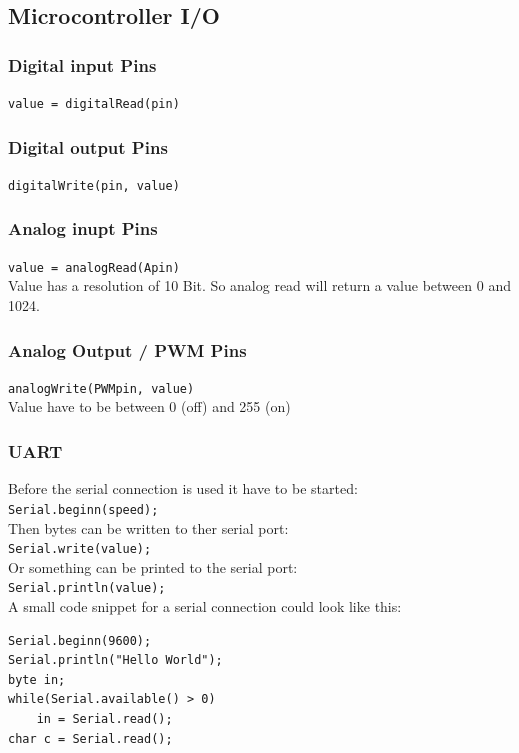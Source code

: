 \documentclass[english, 10pt]{report}
\begin{document}
\subsection{Microcontroller I/O}
\subsubsection{Digital input Pins}
\lstinline|value = digitalRead(pin)|

\subsubsection{Digital output Pins}
\lstinline|digitalWrite(pin, value)|

\subsubsection{Analog inupt Pins}
\lstinline|value = analogRead(Apin)| \\
Value has a resolution of 10 Bit.
So analog read will return a value between 0 and 1024.

\subsubsection{Analog Output / PWM Pins}
\lstinline|analogWrite(PWMpin, value)| \\
Value have to be between 0 (off) and 255 (on)

\subsubsection{UART}
Before the serial connection is used it have to be started: \\
\lstinline|Serial.beginn(speed);| \\
Then bytes can be written to ther serial port: \\
\lstinline|Serial.write(value);| \\
Or something can be printed to the serial port: \\
\lstinline|Serial.println(value);| \\
A small code snippet for a serial connection could look like this:\\
\begin{lstlisting}
Serial.beginn(9600);
Serial.println("Hello World");
byte in;
while(Serial.available() > 0)
	in = Serial.read();
char c = Serial.read();
\end{lstlisting}
\end{document}
